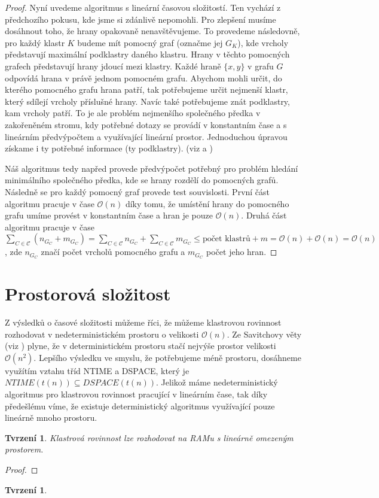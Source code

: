 \documentclass[12pt,a4report]{report}
\newtheorem{tvr}[theorem]{Tvrzení}
\theoremstyle{definition}
\begin{document}
\begin{proof}
Nyní uvedeme algoritmus s lineární časovou složitostí. Ten vychází z předchozího pokusu, kde jsme si zdánlivě nepomohli. Pro zlepšení musíme dosáhnout toho, že hrany opakovaně nenavštěvujeme. To provedeme následovně, pro každý klastr $K$ budeme mít pomocný graf (označme jej $G_K$), kde vrcholy představují maximální podklastry daného klastru. Hrany v těchto pomocných grafech představují hrany jdoucí mezi klastry. Každé hraně $\{x,y\}$ v grafu $G$ odpovídá hrana v právě jednom pomocném grafu. Abychom mohli určit, do kterého pomocného grafu hrana patří, tak potřebujeme určit nejmenší klastr, který sdílejí vrcholy příslušné hrany. Navíc také potřebujeme znát podklastry, kam vrcholy patří. To je ale problém nejmenšího společného předka v zakořeněném stromu, kdy potřebné dotazy se provádí v konstantním čase a s lineárním předvýpočtem a využívající lineární prostor. Jednoduchou úpravou získame i ty potřebné informace (ty podklastry). (viz \cite{lca} a \cite{rmq})

Náš algoritmus tedy napřed provede předvýpočet potřebný pro problém hledání minimálního společného předka, kde se hrany rozdělí do pomocných grafů. Následně se pro každý pomocný graf provede test souvislosti. První část algoritmu pracuje v čase $\mathcal{O}(n)$ díky tomu, že umístění hrany do pomocného grafu umíme provést v konstantním čase a hran je pouze $\mathcal{O}(n)$. Druhá část algoritmu pracuje v čase $\sum\limits_{C \in \mathcal C}(n_{G_C}+m_{G_C}) = \sum\limits_{C \in \mathcal C}n_{G_C} + \sum\limits_{C \in \mathcal C}m_{G_C} \leq \text{počet klastrů} + m = \mathcal O(n) + \mathcal O(n)=\mathcal O(n)$, zde $n_{G_C}$ značí počet vrcholů pomocného grafu a $m_{G_C}$ počet jeho hran.
\end{proof}

\section{Prostorová složitost}
Z výsledků o časové složitosti můžeme říci, že můžeme klastrovou rovinnost rozhodovat v nedeterministickém prostoru o velikosti $\mathcal{O}(n)$. Ze Savitchovy věty (viz \cite{savitch}) plyne, že v deterministickém prostoru stačí nejvýše prostor velikosti $\mathcal{O}(n^2)$.
Lepšího výsledku ve smyslu, že potřebujeme méně prostoru, dosáhneme využítím vztahu tříd NTIME a DSPACE, který je $NTIME(t(n)) \subseteq DSPACE(t(n))$. Jelikož máme nedeterministický algoritmus pro klastrovou rovinnost pracující v lineárním čase, tak díky předešlému víme, že existuje deterministický algoritmus využívající pouze lineárně mnoho prostoru.
\begin{tvr}
Klastrová rovinnost lze rozhodovat na RAMu s lineárně omezeným prostorem.
\end{tvr}
\begin{proof}
\end{proof}

\begin{tvr}
\label{souv_klastry_det_alg}
\end{tvr}
\end{document}
